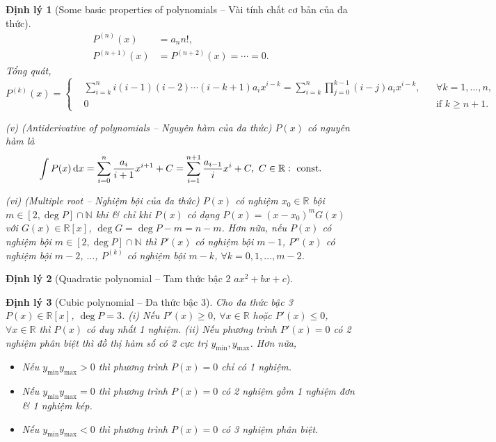 \documentclass{article}
\newtheorem{dinhly}{Định lý}
\begin{document}
\begin{dinhly}[Some basic properties of polynomials -- Vài tính chất cơ bản của đa thức]
\begin{align*}
		P^{(n)}(x) &= a_nn!,\\
		P^{(n + 1)}(x) &= P^{(n + 2)}(x) = \cdots = 0.
	\end{align*}
	Tổng quát,
	\begin{equation*}
		P^{(k)}(x) = \left\{\begin{split}
			&\sum_{i=k}^n i(i - 1)(i - 2)\cdots(i - k + 1)a_ix^{i - k} = \sum_{i=k}^n\prod_{j=0}^{k-1} (i - j)a_ix^{i - k},&&\forall k = 1,\ldots,n,\\
			&0&&\mbox{if } k\ge n + 1.
		\end{split}\right.
	\end{equation*}
	\item(v) {\rm(Antiderivative of polynomials -- Nguyên hàm của đa thức)} $P(x)$ có nguyên hàm là
	\begin{equation*}
		\int P(x)\,{\rm d}x = \sum_{i=0}^n \frac{a_i}{i + 1}x^{i + 1} + C = \sum_{i=1}^{n + 1} \frac{a_{i-1}}{i}x^i + C,\ C\in\mathbb{R}:\mbox{ const}.
	\end{equation*}	
	\item(vi) {\rm(Multiple root -- Nghiệm bội của đa thức)} $P(x)$ có nghiệm $x_0\in\mathbb{R}$ bội $m\in[2,\deg P]\cap\mathbb{N}$ khi \& chỉ khi $P(x)$ có dạng $P(x) = (x - x_0)^mG(x)$ với $G(x)\in\mathbb{R}[x]$, $\deg G = \deg P - m = n - m$. Hơn nữa, nếu $P(x)$ có nghiệm bội $m\in[2,\deg P]\cap\mathbb{N}$ thì $P'(x)$ có nghiệm bội $m - 1$, $P''(x)$ có nghiệm bội $m - 2$, $\ldots$, $P^{(k)}$ có nghiệm bội $m - k$, $\forall k = 0,1,\ldots,m - 2$.
\end{dinhly}

\begin{dinhly}[Quadratic polynomial -- Tam thức bậc 2 $ax^2 + bx + c$]
	
\end{dinhly}

\begin{dinhly}[Cubic polynomial -- Đa thức bậc 3]
	Cho đa thức bậc 3 $P(x)\in\mathbb{R}[x]$, $\deg P = 3$. (i) Nếu $P'(x)\ge0$, $\forall x\in\mathbb{R}$ hoặc $P'(x)\le0$, $\forall x\in\mathbb{R}$ thì $P(x)$ có duy nhất 1 nghiệm. (ii) Nếu phương trình $P'(x) = 0$ có 2 nghiệm phân biệt thì đồ thị hàm số có 2 cực trị $y_{\min},y_{\max}$. Hơn nữa,
	\begin{itemize}
		\item Nếu $y_{\min}y_{\max} > 0$ thì phương trình $P(x) = 0 $ chỉ có 1 nghiệm.
		\item Nếu $y_{\min}y_{\max} = 0$ thì phương trình $P(x) = 0 $ có 2 nghiệm gồm 1 nghiệm đơn \& 1 nghiệm kép.
		\item Nếu $y_{\min}y_{\max} < 0$ thì phương trình $P(x) = 0 $ có 3 nghiệm phân biệt.
	\end{itemize}
\end{dinhly}
\end{document}
